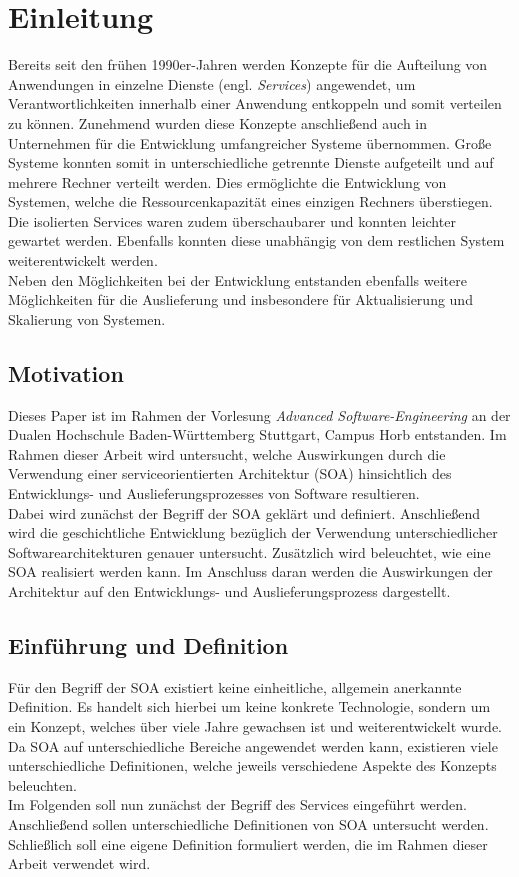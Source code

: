 \section{Einleitung}
\label{ch:introduction}
Bereits seit den frühen 1990er-Jahren werden Konzepte für die Aufteilung von Anwendungen in einzelne Dienste (engl. \textit{Services}) angewendet, um Verantwortlichkeiten innerhalb einer Anwendung entkoppeln und somit verteilen zu können. Zunehmend wurden diese Konzepte anschließend auch in Unternehmen für die Entwicklung umfangreicher Systeme übernommen. Große Systeme konnten somit in unterschiedliche getrennte Dienste aufgeteilt und auf mehrere Rechner verteilt werden. Dies ermöglichte die Entwicklung von Systemen, welche die Ressourcenkapazität eines einzigen Rechners überstiegen. Die isolierten Services waren zudem überschaubarer und konnten leichter gewartet werden. Ebenfalls konnten diese unabhängig von dem restlichen System weiterentwickelt werden.\\
Neben den Möglichkeiten bei der Entwicklung entstanden ebenfalls weitere Möglichkeiten für die Auslieferung und insbesondere für Aktualisierung und Skalierung von Systemen.


\subsection{Motivation}
\label{sec:motivation}
Dieses Paper ist im Rahmen der Vorlesung \textit{Advanced Software-Engineering} an der Dualen Hochschule Baden-Württemberg Stuttgart, Campus Horb entstanden. Im Rahmen dieser Arbeit wird untersucht, welche Auswirkungen durch die Verwendung einer serviceorientierten Architektur (SOA) hinsichtlich des Entwicklungs- und Auslieferungsprozesses von Software resultieren.\\
Dabei wird zunächst der Begriff der SOA geklärt und definiert. Anschließend wird die geschichtliche Entwicklung bezüglich der Verwendung unterschiedlicher Softwarearchitekturen genauer untersucht. Zusätzlich wird beleuchtet, wie eine SOA realisiert werden kann. Im Anschluss daran werden die Auswirkungen der Architektur auf den Entwicklungs- und Auslieferungsprozess dargestellt. 

\subsection{Einführung und Definition}
\label{sec:introduction}
Für den Begriff der SOA existiert keine einheitliche, allgemein anerkannte Definition. Es handelt sich hierbei um keine konkrete Technologie, sondern um ein Konzept, welches über viele Jahre gewachsen ist und weiterentwickelt wurde. Da SOA auf unterschiedliche Bereiche angewendet werden kann, existieren viele unterschiedliche Definitionen, welche jeweils verschiedene Aspekte des Konzepts beleuchten.\\
Im Folgenden soll nun zunächst der Begriff des Services eingeführt werden. Anschließend sollen unterschiedliche Definitionen von SOA untersucht werden. Schließlich soll eine eigene Definition formuliert werden, die im Rahmen dieser Arbeit verwendet wird.

